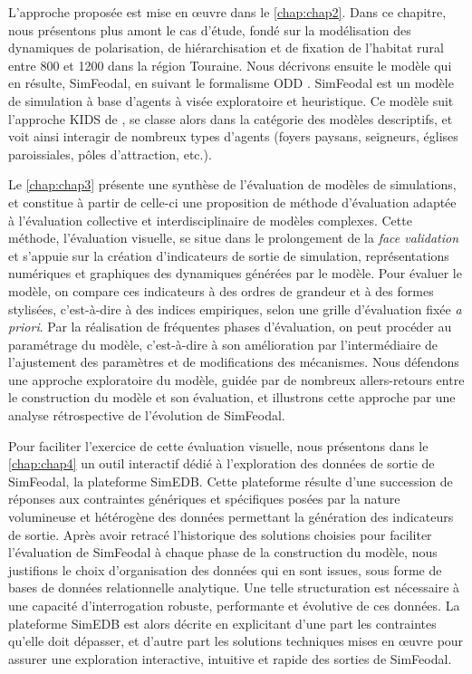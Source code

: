 L'approche proposée est mise en œuvre dans le \cref{chap:chap2}.
Dans ce chapitre, nous présentons plus amont le cas d'étude, fondé sur la modélisation des dynamiques de polarisation, de hiérarchisation et de fixation de l'habitat rural entre 800 et 1200 dans la région Touraine.
Nous décrivons ensuite le modèle qui en résulte, SimFeodal, en suivant le formalisme ODD \autocite{grimm_odd_2010}.
SimFeodal est un modèle de simulation à base d'agents à visée exploratoire et heuristique.
Ce modèle suit l'approche KIDS de \textcite{edmonds_kiss_2005}, se classe alors dans la catégorie des modèles descriptifs, et voit ainsi interagir de nombreux types d'agents (foyers paysans, seigneurs, églises paroissiales, pôles d'attraction, etc.).

Le \cref{chap:chap3} présente une synthèse de l'évaluation de modèles de simulations, et constitue à partir de celle-ci une proposition de méthode d'évaluation adaptée à l'évaluation collective et interdisciplinaire de modèles complexes.
Cette méthode, \og l'évaluation visuelle\fg{}, se situe dans le prolongement de la \textit{face validation} et s'appuie sur la création d'\og{}indicateurs de sortie de simulation\fg{}, représentations numériques et graphiques des dynamiques générées par le modèle.
Pour évaluer le modèle, on compare ces indicateurs à des \og ordres de grandeur\fg{} et à des \og formes stylisées\fg{}, c'est-à-dire à des \og indices empiriques\fg{}, selon une grille d'évaluation fixée \textit{a priori}.
Par la réalisation de fréquentes phases d'évaluation, on peut procéder au \og paramétrage\fg{} du modèle, c'est-à-dire à son amélioration par l'intermédiaire de l'ajustement des paramètres et de modifications des mécanismes.
Nous défendons une approche exploratoire du modèle, guidée par de nombreux allers-retours entre le construction du modèle et son évaluation, et illustrons cette approche par une analyse rétrospective de l'évolution de SimFeodal.

Pour faciliter l'exercice de cette évaluation visuelle, nous présentons dans le \cref{chap:chap4} un outil interactif dédié à l'exploration des données de sortie de SimFeodal, la plateforme SimEDB.
Cette plateforme résulte d'une succession de réponses aux contraintes génériques et spécifiques posées par la nature volumineuse et hétérogène des données permettant la génération des indicateurs de sortie.
Après avoir retracé l'historique des solutions choisies pour faciliter l'évaluation de SimFeodal à chaque phase de la construction du modèle, nous justifions le choix d'organisation des données qui en sont issues, sous forme de bases de données relationnelle analytique. 
Une telle structuration est nécessaire à une capacité d'interrogation robuste, performante et évolutive de ces données.
La plateforme SimEDB est alors décrite en explicitant d'une part les contraintes qu'elle doit dépasser, et d'autre part les solutions techniques mises en œuvre pour assurer une exploration interactive, intuitive et rapide des sorties de SimFeodal.

